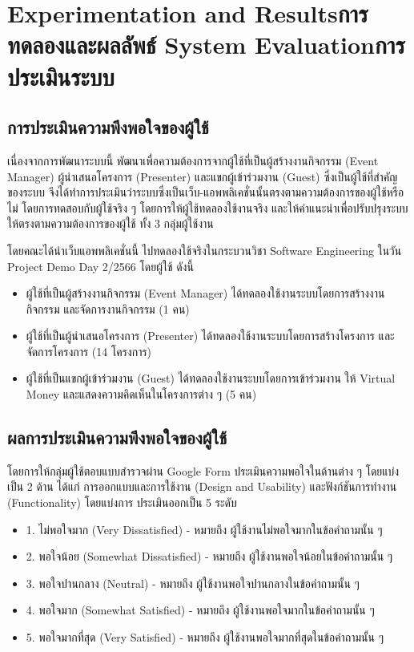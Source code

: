 \chapter{\ifproject%
      \ifenglish Experimentation and Results\else การทดลองและผลลัพธ์\fi
  \else%
      \ifenglish System Evaluation\else การประเมินระบบ\fi
  \fi}

\section{การประเมินความพึงพอใจของผู้ใช้}
เนื่องจากการพัฒนาระบบนี้ พัฒนาเพื่อความต้องการจากผู้ใช้ที่เป็นผู้สร้างงานกิจกรรม (Event Manager) ผู้นำเสนอโครงการ (Presenter) และแขกผู้เข้าร่วมงาน (Guest) ซึ่งเป็นผู้ใช้ที่สำคัญของระบบ จึงได้ทำการประเมินว่าระบบซึ่งเป็นเว็บ-แอพพลิเคชั่นนั้นตรงตามความต้องการของผู้ใช้หรือไม่ โดยการทดสอบกับผู้ใช้จริง ๆ โดยการให้ผู้ใช้ทดลองใช้งานจริง และให้คำแนะนำเพื่อปรับปรุงระบบให้ตรงตามความต้องการของผู้ใช้
ทั้ง 3 กลุ่มผู้ใช้งาน


โดยคณะได้นำเว็บแอพพลิเคชั่นนี้ ไปทดลองใช้จริงในกระบวนวิชา Software Engineering ในวัน Project Demo Day 2/2566 โดยผู้ใช้ ดังนี้
\begin{itemize}
    \item ผู้ใช้ที่เป็นผู้สร้างงานกิจกรรม (Event Manager) ได้ทดลองใช้งานระบบโดยการสร้างงานกิจกรรม และจัดการงานกิจกรรม (1 คน)
    \item ผู้ใช้ที่เป็นผู้นำเสนอโครงการ (Presenter) ได้ทดลองใช้งานระบบโดยการสร้างโครงการ และจัดการโครงการ (14 โครงการ)
    \item ผู้ใช้ที่เป็นแขกผู้เข้าร่วมงาน (Guest) ได้ทดลองใช้งานระบบโดยการเข้าร่วมงาน ให้ Virtual Money และแสดงความคิดเห็นในโครงการต่าง ๆ (5 คน)
\end{itemize}

\section{ผลการประเมินความพึงพอใจของผู้ใช้}
โดยการให้กลุ่มผู้ใช้ตอบแบบสำรวจผ่าน Google Form ประเมินความพอใจในด้านต่าง ๆ โดยแบ่งเป็น 2 ด้าน ได้แก่ การออกแบบและการใช้งาน (Design and Usability) และฟังก์ชันการทำงาน (Functionality)
โดยแบ่งการ ประเมินออกเป็น 5 ระดับ
\begin{itemize}
    \item 1. ไม่พอใจมาก (Very Dissatisfied) - หมายถึง ผู้ใช้งานไม่พอใจมากในข้อคำถามนั้น ๆ
    \item 2. พอใจน้อย (Somewhat Dissatisfied) - หมายถึง ผู้ใช้งานพอใจน้อยในข้อคำถามนั้น ๆ
    \item 3. พอใจปานกลาง (Neutral) - หมายถึง ผู้ใช้งานพอใจปานกลางในข้อคำถามนั้น ๆ
    \item 4. พอใจมาก (Somewhat Satisfied) - หมายถึง ผู้ใช้งานพอใจมากในข้อคำถามนั้น ๆ
    \item 5. พอใจมากที่สุด (Very Satisfied) - หมายถึง ผู้ใช้งานพอใจมากที่สุดในข้อคำถามนั้น ๆ
\end{itemize}

